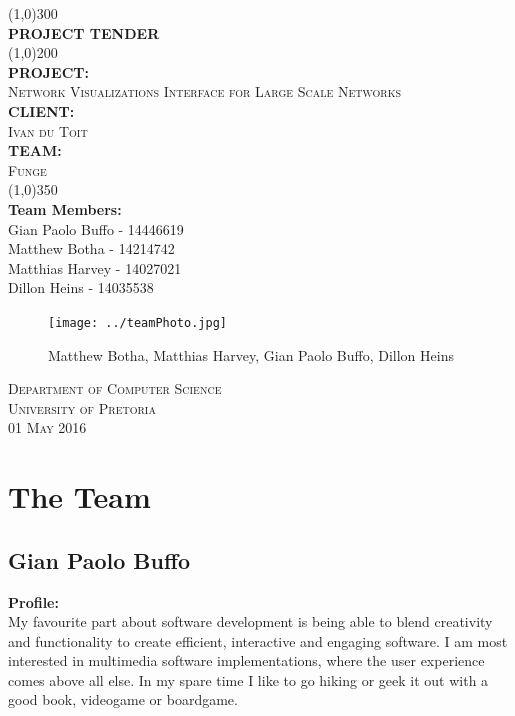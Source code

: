 \documentclass{article}
\begin{document}
\begin{titlepage}
	\begin{center}
		\line(1,0){300}\\
		[6mm]
		\huge{\bfseries PROJECT TENDER}\\
		[2mm]
		\line(1,0){200}\\
		[5mm]
		\large\textbf{PROJECT:}\\\textsc{Network Visualizations Interface for Large Scale Networks}\\
		[3mm]
		\large\textbf{CLIENT:}\\\textsc{Ivan du Toit}\\
		[3mm]
		\large \textbf{TEAM:}\\\textsc{Funge}\\
		\line(1,0){350}\\
		[5mm]
		\large \textbf{Team Members:}\\
		[3mm]
		\large Gian Paolo Buffo - 14446619\\
		\large Matthew Botha - 14214742\\
		\large Matthias Harvey - 14027021\\
        \large Dillon Heins - 14035538\\[3mm]
		\begin{figure}[H]
			\centering
			\texttt{[image: ../teamPhoto.jpg]}
			\caption{Matthew Botha, Matthias Harvey, Gian Paolo Buffo, Dillon Heins}
		\end{figure}
    \end{center}

	\vspace{7mm}

    \begin{flushright}
        \textsc{\large Department of Computer Science\\
        University of Pretoria\\
        01 May 2016\\}
    \end{flushright}
\end{titlepage}

\section{The Team}
	\subsection{Gian Paolo Buffo}
	\textbf{Profile:}\\
	My favourite part about software development is being able to blend creativity and functionality to create efficient, interactive and engaging software. I am most interested in multimedia software implementations, where the user experience comes above all else. In my spare time I like to go hiking or geek it out with a good book, videogame or boardgame.  
\end{document}
